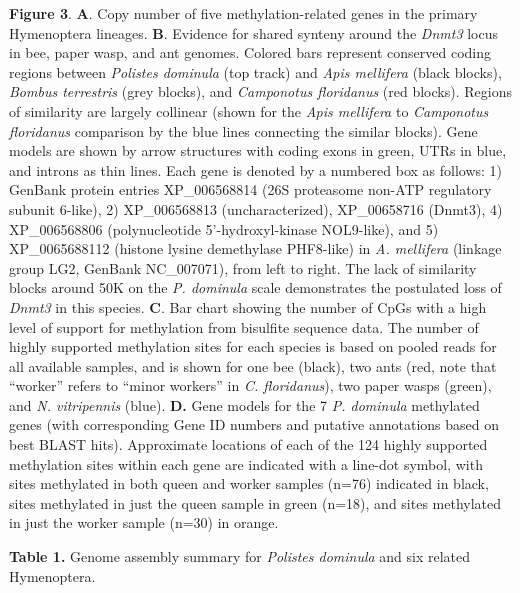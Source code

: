 \textbf{Figure 3}. \textbf{A}. Copy number of five methylation-related
genes in the primary Hymenoptera lineages. \textbf{B}. Evidence for
shared synteny around the \textit{Dnmt3} locus in bee, paper wasp, and ant
genomes. Colored bars represent conserved coding regions between
\textit{Polistes dominula} (top track) and \textit{Apis mellifera} (black
blocks), \textit{Bombus terrestris} (grey blocks), and \textit{Camponotus
floridanus} (red blocks). Regions of similarity are largely collinear
(shown for the \textit{Apis mellifera} to \textit{Camponotus floridanus}
comparison by the blue lines connecting the similar blocks). Gene models
are shown by arrow structures with coding exons in green, UTRs in blue,
and introns as thin lines. Each gene is denoted by a numbered box as
follows: 1) GenBank protein entries XP\_006568814 (26S proteasome
non-ATP regulatory subunit 6-like), 2) XP\_006568813 (uncharacterized),
XP\_00658716 (Dnmt3), 4) XP\_006568806 (polynucleotide
5'-hydroxyl-kinase NOL9-like), and 5) XP\_0065688112 (histone lysine
demethylase PHF8-like) in \textit{A. mellifera} (linkage group LG2,
GenBank NC\_007071), from left to right. The lack of similarity blocks
around 50K on the \textit{P. dominula} scale demonstrates the postulated
loss of \textit{Dnmt3} in this species. \textbf{C}. Bar chart showing the
number of CpGs with a high level of support for methylation from
bisulfite sequence data. The number of highly supported methylation
sites for each species is based on pooled reads for all available
samples, and is shown for one bee (black), two ants (red, note that
``worker'' refers to ``minor workers'' in \textit{C. floridanus}), two
paper wasps (green), and \textit{N. vitripennis} (blue). \textbf{D.} Gene
models for the 7 \textit{P. dominula} methylated genes (with corresponding
Gene ID numbers and putative annotations based on best BLAST hits).
Approximate locations of each of the 124 highly supported methylation
sites within each gene are indicated with a line-dot symbol, with sites
methylated in both queen and worker samples (n=76) indicated in black,
sites methylated in just the queen sample in green (n=18), and sites
methylated in just the worker sample (n=30) in orange.

\textbf{Table 1.} Genome assembly summary for \textit{Polistes dominula}
and six related Hymenoptera.
